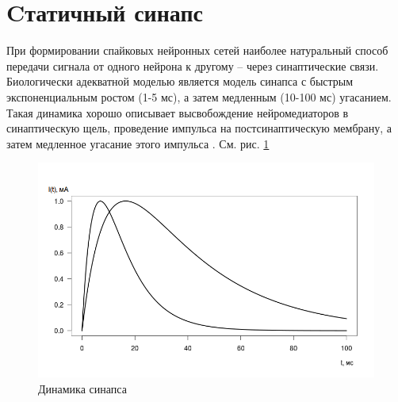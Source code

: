 \documentclass[a4paper,10pt,usenames]{article}
\begin{document}
\section{Cтатичный синапс}
\indent При формировании спайковых нейронных сетей наиболее натуральный способ передачи сигнала от одного нейрона к другому -- через синаптические связи. Биологически адекватной моделью является модель синапса с быстрым экспоненциальным ростом (1-5 мс), а затем медленным (10-100 мс) угасанием. Такая динамика хорошо описывает высвобождение нейромедиаторов в синаптическую щель, проведение импульса на постсинаптическую мембрану, а затем медленное угасание этого импульса \cite{wiki:epsp}. См. рис. \ref{synapse_pic}
\begin{figure}[ht]
\centering
\captionsetup{justification=centering,margin=1cm}
\includegraphics[width=120mm,scale=1]{syn_exp.png}
\caption{Динамика синапса}
\label{synapse_pic}
\end{figure}\\
\FloatBarrier
\end{document}
